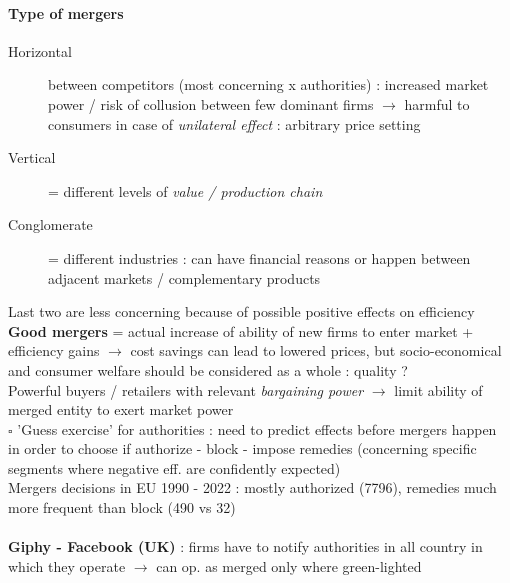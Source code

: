\documentclass[10pt]{article}
\begin{document}
\paragraph{Type of mergers}
\begin{description}
    \item[Horizontal] between competitors (most concerning x authorities) : increased market power / risk of collusion between few dominant firms $\rightarrow$ harmful to consumers in case of \textit{unilateral effect} : arbitrary price setting
    \item[Vertical] = different levels of \textit{value / production chain}
    \item[Conglomerate] = different industries : can have financial reasons or happen between adjacent markets / complementary products
\end{description}
Last two are less concerning because of possible positive effects on efficiency
\\\textbf{Good mergers} = actual increase of ability of new firms to enter market + efficiency gains $\rightarrow$ cost savings can lead to lowered prices, but socio-economical and consumer welfare should be considered as a whole : quality ? 
\\Powerful buyers / retailers with relevant \textit{bargaining power} $\rightarrow$ limit ability of merged entity to exert market power
\\$\square$ 'Guess exercise' for authorities : need to predict effects before mergers happen in order to choose if authorize - block - impose remedies (concerning specific segments where negative eff. are confidently expected)
\\Mergers decisions in EU 1990 - 2022 : mostly authorized (7796), remedies much more frequent than block (490 vs 32)
\\~\\\textbf{Giphy - Facebook (UK)} : firms have to notify authorities in all country in which they operate $\rightarrow$ can op. as merged only where green-lighted 
\end{document}
